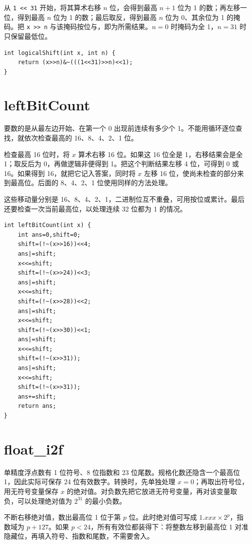 \documentclass[12pt,a4paper]{ctexart}
\begin{document}
从 \texttt{1 << 31} 开始，将其算术右移 $n$ 位，会得到最高 $n+1$ 位为 1 的数；再左移一位，得到最高 $n$ 位为 1 的数；最后取反，得到最高 $n$ 位为 0、其余位为 1 的掩码。把 \texttt{x >> n} 与该掩码按位与，即为所需结果。$n=0$ 时掩码为全 1，$n=31$ 时只保留最低位。

\begin{lstlisting}
int logicalShift(int x, int n) {
    return (x>>n)&~(((1<<31)>>n)<<1);
}
\end{lstlisting}

\section{leftBitCount}
要数的是从最左边开始、在第一个 0 出现前连续有多少个 1。不能用循环逐位查找，就依次检查最高的 16、8、4、2、1 位。

检查最高 16 位时，将 $x$ 算术右移 16 位。如果这 16 位全是 1，右移结果会是全 1；取反后为 0，再做逻辑非便得到 1。把这个判断结果左移 4 位，可得到 0 或 16。如果得到 16，就把它记入答案，同时将 $x$ 左移 16 位，使尚未检查的部分来到最高位。后面的 8、4、2、1 位使用同样的方法处理。

这些移动量分别是 16、8、4、2、1，二进制位互不重叠，可用按位或累计。最后还要检查一次当前最高位，以处理连续 32 位都为 1 的情况。

\begin{lstlisting}
int leftBitCount(int x) {
    int ans=0,shift=0;
    shift=(!~(x>>16))<<4;
    ans|=shift;
    x<<=shift;
    shift=(!~(x>>24))<<3;
    ans|=shift;
    x<<=shift;
    shift=(!~(x>>28))<<2;
    ans|=shift;
    x<<=shift;
    shift=(!~(x>>30))<<1;
    ans|=shift;
    x<<=shift;
    shift=(!~(x>>31));
    ans|=shift;
    x<<=shift;
    shift=(!~(x>>31));
    ans+=shift;
    return ans;
}
\end{lstlisting}

\section{float\_i2f}
单精度浮点数有 1 位符号、8 位指数和 23 位尾数。规格化数还隐含一个最高位 1，因此实际可保存 24 位有效数字。转换时，先单独处理 $x=0$；再取出符号位，用无符号变量保存 $x$ 的绝对值。对负数先把它放进无符号变量，再对该变量取负，可以处理绝对值为 $2^{31}$ 的最小负数。

不断右移绝对值，数出最高位 1 位于第 $p$ 位。此时绝对值可写成 $1.xxx\times2^p$，指数域为 $p+127$。如果 $p<24$，所有有效位都装得下：将整数左移到最高位 1 对准隐藏位，再填入符号、指数和尾数，不需要舍入。
\end{document}
